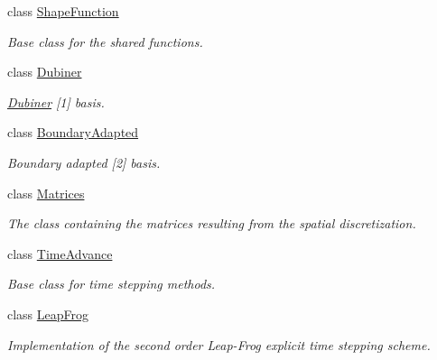 \begin{DoxyCompactItemize}
class \hyperlink{classTspeed_1_1ShapeFunction}{Shape\-Function}
\begin{DoxyCompactList}\small\item\em Base class for the shared functions. \end{DoxyCompactList}\item 
class \hyperlink{classTspeed_1_1Dubiner}{Dubiner}
\begin{DoxyCompactList}\small\item\em \hyperlink{classTspeed_1_1Dubiner}{Dubiner} \mbox{[}1\mbox{]} basis. \end{DoxyCompactList}\item 
class \hyperlink{classTspeed_1_1BoundaryAdapted}{Boundary\-Adapted}
\begin{DoxyCompactList}\small\item\em Boundary adapted \mbox{[}2\mbox{]} basis. \end{DoxyCompactList}\item 
class \hyperlink{classTspeed_1_1Matrices}{Matrices}
\begin{DoxyCompactList}\small\item\em The class containing the matrices resulting from the spatial discretization. \end{DoxyCompactList}\item 
class \hyperlink{classTspeed_1_1TimeAdvance}{Time\-Advance}
\begin{DoxyCompactList}\small\item\em Base class for time stepping methods. \end{DoxyCompactList}\item 
class \hyperlink{classTspeed_1_1LeapFrog}{Leap\-Frog}
\begin{DoxyCompactList}\small\item\em Implementation of the second order Leap-\/\-Frog explicit time stepping scheme. \end{DoxyCompactList}\end{DoxyCompactItemize}
